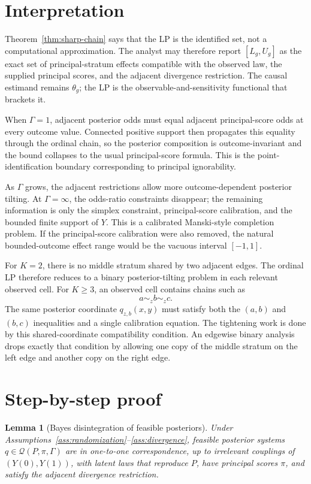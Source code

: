 \documentclass[11pt]{article}
\theoremstyle{definition}
\theoremstyle{plain}
\newtheorem{lemma}{Lemma}
\theoremstyle{remark}
\begin{document}
\section{Interpretation}
Theorem~\ref{thm:sharp-chain} says that the LP is the identified set, not a
computational approximation.  The analyst may therefore report
\([L_g,U_g]\) as the exact set of principal-stratum effects compatible with the
observed law, the supplied principal scores, and the adjacent divergence
restriction.  The causal estimand remains \(\theta_g\); the LP is the
observable-and-sensitivity functional that brackets it.

When \(\Gamma=1\), adjacent posterior odds must equal adjacent principal-score
odds at every outcome value.  Connected positive support then propagates this
equality through the ordinal chain, so the posterior composition is
outcome-invariant and the bound collapses to the usual principal-score formula.
This is the point-identification boundary corresponding to principal
ignorability.

As \(\Gamma\) grows, the adjacent restrictions allow more outcome-dependent
posterior tilting.  At \(\Gamma=\infty\), the odds-ratio constraints disappear;
the remaining information is only the simplex constraint, principal-score
calibration, and the bounded finite support of \(Y\).  This is a calibrated
Manski-style completion problem.  If the principal-score calibration were also
removed, the natural bounded-outcome effect range would be the vacuous interval
\([-1,1]\).

For \(K=2\), there is no middle stratum shared by two adjacent edges.  The
ordinal LP therefore reduces to a binary posterior-tilting problem in each
relevant observed cell.  For \(K\ge3\), an observed cell contains chains such as
\[
  a\sim_z b\sim_z c.
\]
The same posterior coordinate \(q_{z,b}(x,y)\) must satisfy both the
\((a,b)\) and \((b,c)\) inequalities and a single calibration equation.  The
tightening work is done by this shared-coordinate compatibility condition.
An edgewise binary analysis drops exactly that condition by allowing one copy
of the middle stratum on the left edge and another copy on the right edge.

\section{Step-by-step proof}
\begin{lemma}[Bayes disintegration of feasible posteriors]\label{lem:disintegration}
Under Assumptions~\ref{ass:randomization}--\ref{ass:divergence}, feasible
posterior systems \(q\in\mathcal Q(P,\pi,\Gamma)\) are in one-to-one
correspondence, up to irrelevant couplings of \((Y(0),Y(1))\), with latent laws
that reproduce \(P\), have principal scores \(\pi\), and satisfy the adjacent
divergence restriction.
\end{lemma}
\end{document}
